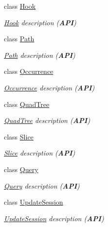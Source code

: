 \begin{DoxyCompactItemize}
class \hyperlink{classHurricane_1_1Hook}{Hook}
\begin{DoxyCompactList}\small\item\em \hyperlink{classHurricane_1_1Hook}{Hook} description ({\bfseries A\-P\-I}) \end{DoxyCompactList}\item 
class \hyperlink{classHurricane_1_1Path}{Path}
\begin{DoxyCompactList}\small\item\em \hyperlink{classHurricane_1_1Path}{Path} description ({\bfseries A\-P\-I}) \end{DoxyCompactList}\item 
class \hyperlink{classHurricane_1_1Occurrence}{Occurrence}
\begin{DoxyCompactList}\small\item\em \hyperlink{classHurricane_1_1Occurrence}{Occurrence} description ({\bfseries A\-P\-I}) \end{DoxyCompactList}\item 
class \hyperlink{classHurricane_1_1QuadTree}{Quad\-Tree}
\begin{DoxyCompactList}\small\item\em \hyperlink{classHurricane_1_1QuadTree}{Quad\-Tree} description ({\bfseries A\-P\-I}) \end{DoxyCompactList}\item 
class \hyperlink{classHurricane_1_1Slice}{Slice}
\begin{DoxyCompactList}\small\item\em \hyperlink{classHurricane_1_1Slice}{Slice} description ({\bfseries A\-P\-I}) \end{DoxyCompactList}\item 
class \hyperlink{classHurricane_1_1Query}{Query}
\begin{DoxyCompactList}\small\item\em \hyperlink{classHurricane_1_1Query}{Query} description ({\bfseries A\-P\-I}) \end{DoxyCompactList}\item 
class \hyperlink{classHurricane_1_1UpdateSession}{Update\-Session}
\begin{DoxyCompactList}\small\item\em \hyperlink{classHurricane_1_1UpdateSession}{Update\-Session} description ({\bfseries A\-P\-I}) \end{DoxyCompactList}\end{DoxyCompactItemize}
